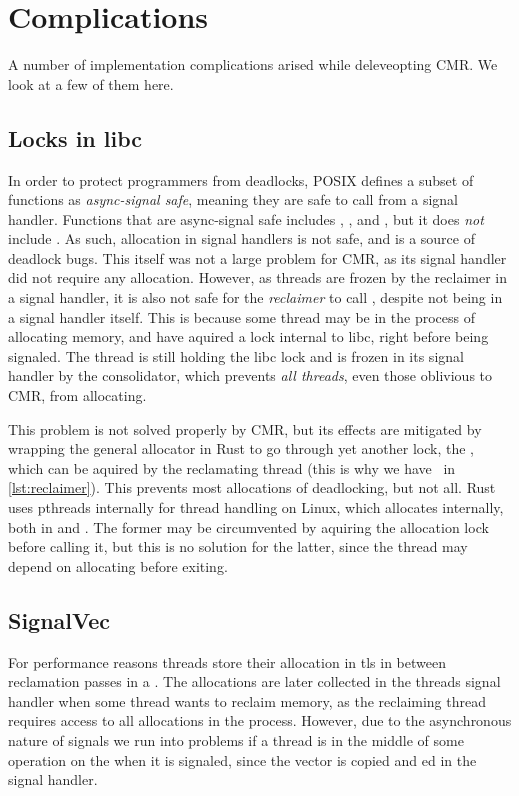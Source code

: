 \section{Complications}

A number of implementation complications arised while deleveopting CMR\@. We look at a few of them
here.

\subsection{Locks in libc\label{sec:alloc-lock}}

In order to protect programmers from deadlocks, POSIX defines a subset of functions as
\emph{async-signal safe}, meaning they are safe to call from a signal handler. Functions that are
async-signal safe includes , , and , but it does \emph{not}
include . As such, allocation in signal handlers is not safe, and is a source of
deadlock bugs. This itself was not a large problem for CMR, as its signal handler did not require
any allocation. However, as threads are frozen by the reclaimer in a signal handler, it is also not
safe for the \emph{reclaimer} to call , despite not being in a signal handler itself.
This is because some thread may be in the process of allocating memory, and have aquired a lock
internal to libc, right before being signaled. The thread is still holding the libc lock and is
frozen in its signal handler by the consolidator, which prevents \emph{all threads}, even those
oblivious to CMR, from allocating.

This problem is not solved properly by CMR, but its effects are mitigated by wrapping the general
allocator in Rust to go through yet another lock, the , which can be aquired by
the reclamating thread (this is why we have~ in \cref{lst:reclaimer}). This
prevents most allocations of deadlocking, but not all. Rust uses \gls{pthreads} internally for thread
handling on Linux, which allocates internally, both in  and . The former may
be circumvented by aquiring the allocation lock before calling it, but this is no solution for the
latter, since the thread may depend on allocating before exiting.


\subsection{SignalVec}

For performance reasons threads store their allocation in \gls{tls} in between reclamation passes
in a .  The allocations are later collected in the threads signal handler when some
thread wants to reclaim memory, as the reclaiming thread requires access to all allocations in the
process. However, due to the asynchronous nature of signals we run into problems if a thread is in
the middle of some operation on the  when it is signaled, since the vector is copied and
ed in the signal handler.

